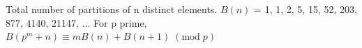 Total number of partitions of n distinct elements.\newline
$B(n)$ = 1, 1, 2, 5, 15, 52, 203, 877, 4140, 21147, ...\newline
For p prime,\newline
$B(p^m+n) \equiv mB(n)+B(n+1)\;(\text{mod}\;p)$
